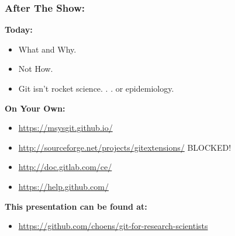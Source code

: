 \documentclass{beamer}
\begin{document}
\begin{frame} %
  \frametitle{After The Show:}

  \textbf{Today:}
  \begin{itemize}
  \item What and Why.
  \item Not How.
  \item Git isn't rocket science. . . or epidemiology.
  \end{itemize}

  \bigskip
  \textbf{On Your Own:}
  \begin{itemize}
  \item {\url{https://msysgit.github.io/}}
  \item {\url{http://sourceforge.net/projects/gitextensions/}} BLOCKED!
  \item {\url{http://doc.gitlab.com/ce/}}
  \item {\url{https://help.github.com/}}
  \end{itemize}

  \bigskip
  \textbf{This presentation can be found at:}
  \begin{itemize}
  \item {\small{\url{https://github.com/choens/git-for-research-scientists}}}
  \end{itemize}
  
\end{frame}
\end{document}
